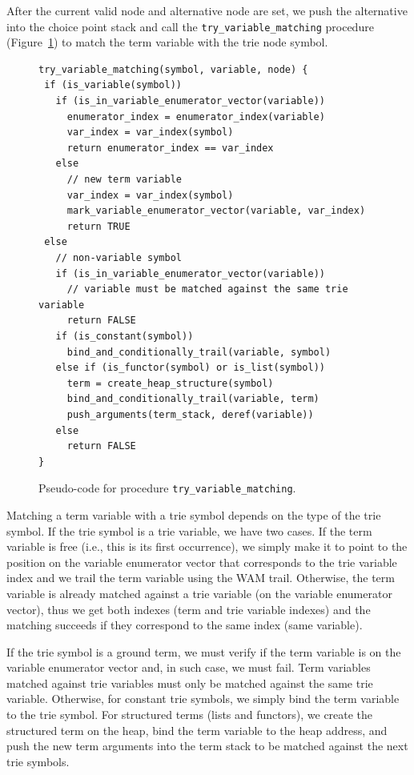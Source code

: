 After the current valid node and alternative node are set, we push the
alternative into the choice point stack and call the
\texttt{try\_variable\_matching} procedure (Figure~\ref{fig:try_variable_matching})
to match the term variable with the trie node symbol.

\begin{figure}[!ht]
\begin{Verbatim}
try_variable_matching(symbol, variable, node) {
 if (is_variable(symbol))
   if (is_in_variable_enumerator_vector(variable))
     enumerator_index = enumerator_index(variable)
     var_index = var_index(symbol)
     return enumerator_index == var_index
   else
     // new term variable
     var_index = var_index(symbol)
     mark_variable_enumerator_vector(variable, var_index)
     return TRUE
 else
   // non-variable symbol
   if (is_in_variable_enumerator_vector(variable))
     // variable must be matched against the same trie variable
     return FALSE
   if (is_constant(symbol))
     bind_and_conditionally_trail(variable, symbol)
   else if (is_functor(symbol) or is_list(symbol))
     term = create_heap_structure(symbol)
     bind_and_conditionally_trail(variable, term)
     push_arguments(term_stack, deref(variable))
   else
     return FALSE
}
\end{Verbatim}
\caption{Pseudo-code for procedure \texttt{try\_variable\_matching}.}
\label{fig:try_variable_matching}
\end{figure}

Matching a term variable with a trie symbol depends on the type of the
trie symbol. If the trie symbol is a trie variable, we have two cases.
If the term variable is free (i.e., this is its first occurrence), we
simply make it to point to the position on the variable enumerator
vector that corresponds to the trie variable index and we trail the
term variable using the WAM trail. Otherwise, the term variable is
already matched against a trie variable (on the variable enumerator
vector), thus we get both indexes (term and trie variable indexes) and
the matching succeeds if they correspond to the same index (same
variable).

If the trie symbol is a ground term, we must verify if the term
variable is on the variable enumerator vector and, in such case, we
must fail. Term variables matched against trie variables must only be
matched against the same trie variable. Otherwise, for constant trie
symbols, we simply bind the term variable to the trie symbol. For
structured terms (lists and functors), we create the structured term
on the heap, bind the term variable to the heap address, and push the
new term arguments into the term stack to be matched against the next
trie symbols.

